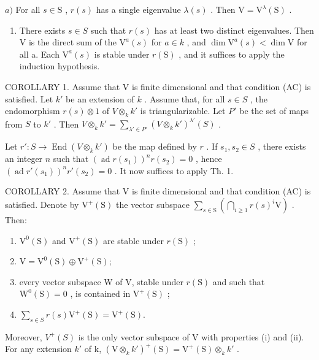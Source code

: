 \(a)\) For all \(s \in \mathrm{S}\) , \(r(s)\) has a single eigenvalue \(\lambda(s)\) . Then \(\mathrm{V} = \mathrm{V}^{\lambda}(\mathrm{S})\) .

\begin{enumerate}
\def\labelenumi{\alph{enumi})}
\setcounter{enumi}{1}
\tightlist
\item
  There exists \(s \in S\) such that \(r(s)\) has at least two distinct eigenvalues. Then V is the direct sum of the \(\mathrm{V}^{a}(s)\) for \(a \in k\) , and \(\dim \mathrm{V}^{a}(s) < \dim \mathrm{V}\) for all a. Each \(\mathrm{V}^{a}(s)\) is stable under \(r(\mathrm{S})\) , and it suffices to apply the induction hypothesis.
\end{enumerate}

COROLLARY 1. Assume that V is finite dimensional and that condition (AC) is satisfied. Let \(k'\) be an extension of \(k\) . Assume that, for all \(s \in S\) , the endomorphism \(r(s) \otimes 1\) of \(V \otimes_k k'\) is triangularizable. Let \(P'\) be the set of maps from \(S\) to \(k'\) . Then \(V \otimes_k k' = \sum_{\lambda' \in P'} (V \otimes_k k')^{\lambda'}(S)\) .

Let \(r': S \to \operatorname{End}(V \otimes_k k')\) be the map defined by \(r\) . If \(s_1, s_2 \in S\) , there exists an integer \(n\) such that \((\operatorname{ad} r(s_1))^n r(s_2) = 0\) , hence \((\operatorname{ad} r'(s_1))^n r'(s_2) = 0\) . It now suffices to apply Th. 1.

COROLLARY 2. Assume that V is finite dimensional and that condition (AC) is satisfied. Denote by \(\mathrm{V}^{+}(\mathrm{S})\) the vector subspace \(\sum_{s\in \mathrm{S}}\left(\bigcap_{i\geq 1}r(s)^{i}\mathrm{V}\right)\) . Then:

\begin{enumerate}
\def\labelenumi{(\roman{enumi})}
\item
  \(\mathrm{V}^0 (\mathrm{S})\) and \(\mathrm{V^{+}(S)}\) are stable under \(r(\mathrm{S})\) ;
\item
  \(\mathrm{V} = \mathrm{V}^{0}(\mathrm{S}) \oplus \mathrm{V}^{+}(\mathrm{S});\)
\item
  every vector subspace W of V, stable under \(r(\mathrm{S})\) and such that \(\mathrm{W}^0 (\mathrm{S}) = 0\) , is contained in \(\mathrm{V}^{+}(\mathrm{S})\) ;
\item
  \(\sum_{s\in S}r(s)\mathrm{V}^{+}(\mathrm{S}) = \mathrm{V}^{+}(\mathrm{S}).\)
\end{enumerate}

Moreover, \(V^{+}(S)\) is the only vector subspace of V with properties (i) and (ii). For any extension \(k'\) of k, \((\mathrm{V} \otimes_{k} k')^{+}(\mathrm{S}) = \mathrm{V}^{+}(\mathrm{S}) \otimes_{k} k'\) .

